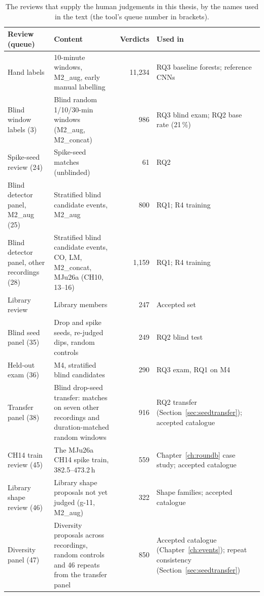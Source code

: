 \begin{table}[htbp]
\caption[{The reviews that supply the human judgements in this thesis.}]{The reviews that supply the human judgements in this thesis, by the names used in the text (the tool's queue number in brackets).}
\label{tab:queues}
\small
\begin{tabularx}{\textwidth}{p{3.3cm} p{3.6cm} r X}
\toprule
\textbf{Review (queue)} & \textbf{Content} & \textbf{Verdicts} & \textbf{Used in}\\
\midrule
Hand labels & 10-minute windows, M2\_aug, early manual labelling & 11,234 & RQ3 baseline forests; reference CNNs\\
Blind window labels (3) & Blind random 1/10/30-min windows (M2\_aug, M2\_concat) & 986 & RQ3 blind exam; RQ2 base rate (21\,\%)\\
Spike-seed review (24) & Spike-seed matches (unblinded) & 61 & RQ2\\
Blind detector panel, M2\_aug (25) & Stratified blind candidate events, M2\_aug & 800 & RQ1; R4 training\\
Blind detector panel, other recordings (28) & Stratified blind candidate events, CO, LM, M2\_concat, MJu26a (CH10, 13--16) & 1,159 & RQ1; R4 training\\
Library review & Library members & 247 & Accepted set\\
Blind seed panel (35) & Drop and spike seeds, re-judged dips, random controls & 249 & RQ2 blind test\\
Held-out exam (36) & M4, stratified blind candidates & 290 & RQ3 exam, RQ1 on M4\\
Transfer panel (38) & Blind drop-seed transfer: matches on seven other recordings and duration-matched random windows & 916 & RQ2 transfer (Section~\ref{sec:seedtransfer}); accepted catalogue\\
CH14 train review (45) & The MJu26a CH14 spike train, 382.5--473.2\,h & 559 & Chapter~\ref{ch:roundb} case study; accepted catalogue\\
Library shape review (46) & Library shape proposals not yet judged (g-11, M2\_aug) & 322 & Shape families; accepted catalogue\\
Diversity panel (47) & Diversity proposals across recordings, random controls and 46 repeats from the transfer panel & 850 & Accepted catalogue (Chapter~\ref{ch:events}); repeat consistency (Section~\ref{sec:seedtransfer})\\
\bottomrule
\end{tabularx}
\end{table}


